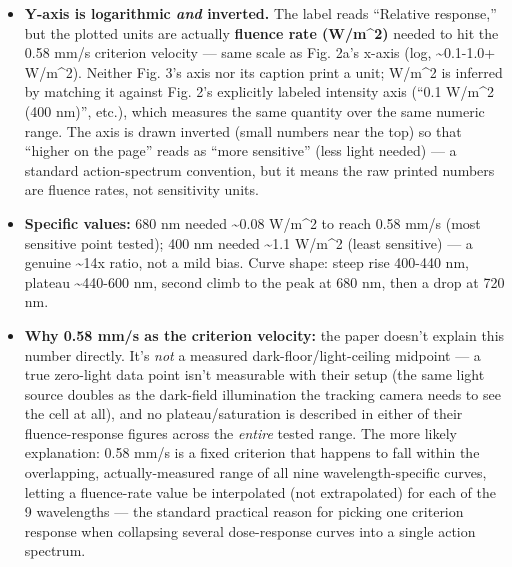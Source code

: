 \documentclass[
]{article}
\providecommand{\tightlist}{%
  \setlength{\itemsep}{0pt}\setlength{\parskip}{0pt}}
\begin{document}
\begin{itemize}
\tightlist
\item
  \textbf{Y-axis is logarithmic \emph{and} inverted.} The label reads
  ``Relative response,'' but the plotted units are actually
  \textbf{fluence rate (W/m\^{}2)} needed to hit the 0.58 mm/s criterion
  velocity --- same scale as Fig. 2a's x-axis (log,
  \textasciitilde0.1-1.0+ W/m\^{}2). Neither Fig. 3's axis nor its
  caption print a unit; W/m\^{}2 is inferred by matching it against Fig.
  2's explicitly labeled intensity axis (``0.1 W/m\^{}2 (400 nm)'',
  etc.), which measures the same quantity over the same numeric range.
  The axis is drawn inverted (small numbers near the top) so that
  ``higher on the page'' reads as ``more sensitive'' (less light needed)
  --- a standard action-spectrum convention, but it means the raw
  printed numbers are fluence rates, not sensitivity units.
\item
  \textbf{Specific values:} 680 nm needed \textasciitilde0.08 W/m\^{}2
  to reach 0.58 mm/s (most sensitive point tested); 400 nm needed
  \textasciitilde1.1 W/m\^{}2 (least sensitive) --- a genuine
  \textasciitilde14x ratio, not a mild bias. Curve shape: steep rise
  400-440 nm, plateau \textasciitilde440-600 nm, second climb to the
  peak at 680 nm, then a drop at 720 nm.
\item
  \textbf{Why 0.58 mm/s as the criterion velocity:} the paper doesn't
  explain this number directly. It's \emph{not} a measured
  dark-floor/light-ceiling midpoint --- a true zero-light data point
  isn't measurable with their setup (the same light source doubles as
  the dark-field illumination the tracking camera needs to see the cell
  at all), and no plateau/saturation is described in either of their
  fluence-response figures across the \emph{entire} tested range. The
  more likely explanation: 0.58 mm/s is a fixed criterion that happens
  to fall within the overlapping, actually-measured range of all nine
  wavelength-specific curves, letting a fluence-rate value be
  interpolated (not extrapolated) for each of the 9 wavelengths --- the
  standard practical reason for picking one criterion response when
  collapsing several dose-response curves into a single action spectrum.
\end{itemize}
\end{document}

